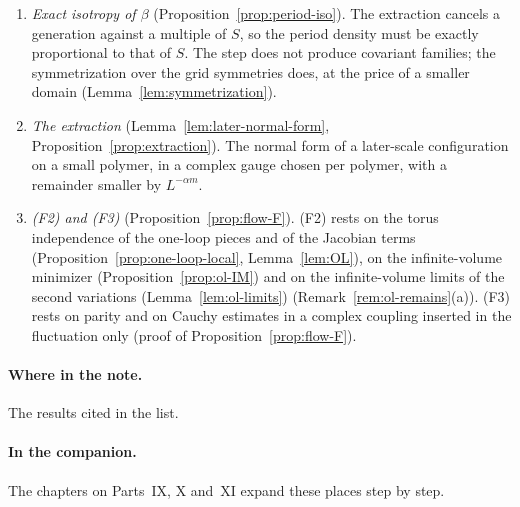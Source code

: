 \begin{enumerate}[label=(\arabic*)]
\item \emph{Exact isotropy of $\beta$} (Proposition~\ref{prop:period-iso}). The extraction cancels a generation against a multiple of $S$, so the period density must be exactly proportional to that of $S$. The step does not produce covariant families; the symmetrization over the grid symmetries does, at the price of a smaller domain (Lemma~\ref{lem:symmetrization}).
\item \emph{The extraction} (Lemma~\ref{lem:later-normal-form}, Proposition~\ref{prop:extraction}). The normal form of a later-scale configuration on a small polymer, in a complex gauge chosen per polymer, with a remainder smaller by $L^{-\alpha m}$.
\item \emph{(F2) and (F3)} (Proposition~\ref{prop:flow-F}). (F2) rests on the torus independence of the one-loop pieces and of the Jacobian terms (Proposition~\ref{prop:one-loop-local}, Lemma~\ref{lem:OL}), on the infinite-volume minimizer (Proposition~\ref{prop:ol-IM}) and on the infinite-volume limits of the second variations (Lemma~\ref{lem:ol-limits}) (Remark~\ref{rem:ol-remains}(a)). (F3) rests on parity and on Cauchy estimates in a complex coupling inserted in the fluctuation only (proof of Proposition~\ref{prop:flow-F}).
\end{enumerate}

\paragraph{Where in the note.} The results cited in the list.

\paragraph{In the companion.} The chapters on Parts~IX, X and~XI expand these places step by step.
